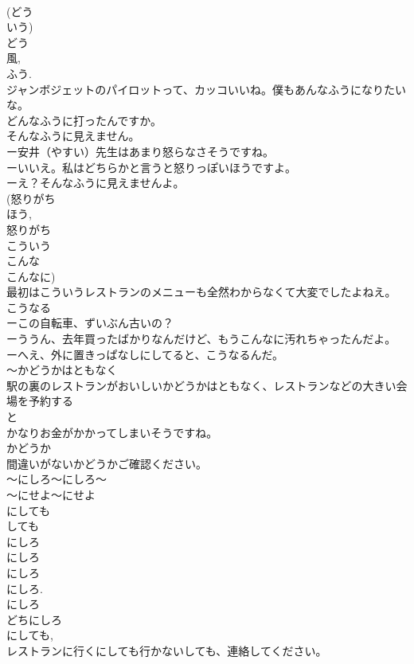 \documentclass[8pt]{extreport}
\begin{document}
\begin{CJK}{UTF8}{min}
\\	(どう
\\	いう)
\\	どう
\\	風, 
\\	ふう. 
\\	ジャンボジェットのパイロットって、カッコいいね。僕もあんなふうになりたいな。
\\	どんなふうに打ったんですか。
\\	そんなふうに見えません。
\\	ー安井（やすい）先生はあまり怒らなさそうですね。
\\	ーいいえ。私はどちらかと言うと怒りっぽいほうですよ。
\\	ーえ？そんなふうに見えませんよ。
\\	(怒りがち 
\\	ほう, 
\\	怒りがち 
\\	こういう
\\	こんな 
\\	こんなに)
\\	最初はこういうレストランのメニューも全然わからなくて大変でしたよねえ。
\\	こうなる
\\	ーこの自転車、ずいぶん古いの？
\\	ーううん、去年買ったばかりなんだけど、もうこんなに汚れちゃったんだよ。
\\	ーへえ、外に置きっぱなしにしてると、こうなるんだ。	
\\	～かどうかはともなく
\\	駅の裏のレストランがおいしいかどうかはともなく、レストランなどの大きい会場を予約する
\\	と
\\	かなりお金がかかってしまいそうですね。
\\	かどうか
\\	間違いがないかどうかご確認ください。
\\	～にしろ～にしろ～
\\	～にせよ～にせよ
\\	にしても 
\\	しても
\\	にしろ
\\	にしろ 
\\	にしろ
\\	にしろ. 
\\	にしろ 
\\	どちにしろ 
\\	にしても, 
\\	レストランに行くにしても行かないしても、連絡してください。

\end{CJK}
\end{document}
